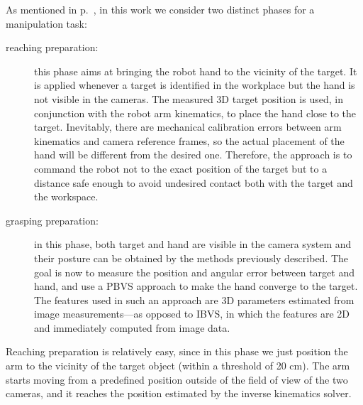 



As mentioned in p.~\pageref{intro:reaching_phases}, in this work we consider two distinct phases for a manipulation task:

\begin{description}
\item[reaching preparation:] this phase aims at bringing the robot hand to the vicinity of the target. It is applied whenever a target is identified in the workplace but the hand is not visible in the cameras. The measured 3D target position is used, in conjunction with the robot arm kinematics, to place the hand close to the target. Inevitably, there are mechanical calibration errors between arm kinematics and camera reference frames, so the actual placement of the hand will be different from the desired one. Therefore, the approach is to command the robot not to the exact position of the target but to a distance safe enough to avoid undesired contact both with the target and the workspace.

\item[grasping preparation:] in this phase, both target and hand are visible in the camera system and their posture can be obtained by the methods previously described. The goal is now to measure the position and angular error between target and hand, and use a \ac{PBVS} approach to make the hand converge to the target. The features used in such an approach are 3D parameters estimated from image measurements---as opposed to \ac{IBVS}, in which the features are 2D and immediately computed from image data.
\end{description}

Reaching preparation is relatively easy, since in this phase we just position the arm to the vicinity of the target object (within a threshold of 20 cm). The arm starts moving from a predefined position outside of the field of view of the two cameras, and it reaches the position estimated by the inverse kinematics solver.

